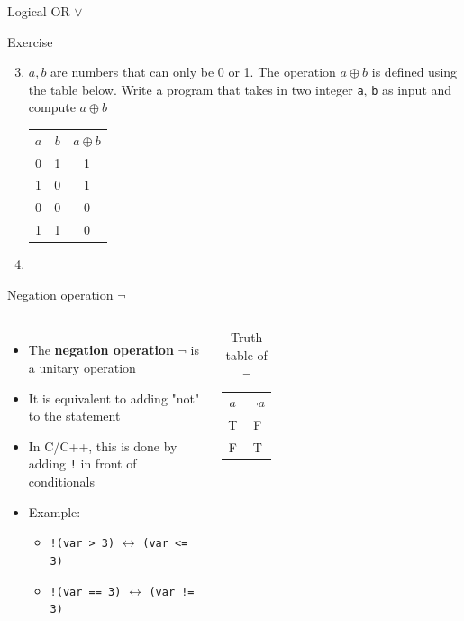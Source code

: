 \documentclass[10pt,xcolor={table,dvipsnames},t]{beamer}
\begin{document}
\begin{frame}{Logical OR $\lor$}
  \begin{exampleblock}{Exercise}
    \begin{enumerate}
      \setcounter{enumi}{2}
      \item $a,b$ are numbers that can only be 0 or 1. The operation $a \oplus b$ is defined using the table below. Write a program that takes in two integer \texttt{a}, \texttt{b} as input and compute $a\oplus b$
      \begin{table}[]
        \begin{tabular}{ccc}
        $a$ & $b$ & $a\oplus b$ \\
        0   & 1   & 1           \\
        1   & 0   & 1           \\
        0   & 0   & 0           \\
        1   & 1   & 0          
        \end{tabular}
        \end{table}
      \item 
    \end{enumerate}
  \end{exampleblock}
  
\end{frame}

\begin{frame}{Negation operation $\neg$}
  \begin{columns}
    \begin{itemize}
      \item The \textbf{negation operation} $\neg$ is a unitary operation 
      \item It is equivalent to adding "not" to the statement 
      \item In C/C++, this is done by adding \texttt{!} in front of conditionals
      \item Example:
      \begin{itemize}
        \item \texttt{!(var > 3)} $\leftrightarrow$ \texttt{(var <= 3)}
        \item \texttt{!(var == 3)} $\leftrightarrow$ \texttt{(var != 3)}
      \end{itemize}
    \end{itemize}
    \begin{table}[]
      \begin{tabular}{cc}
      $a$ & $\neg a$  \\
      T & F \\
      F & T
      \end{tabular}
      \caption{Truth table of $\neg$}
      \end{table}
  \end{columns}
  
\end{frame}
\end{document}
